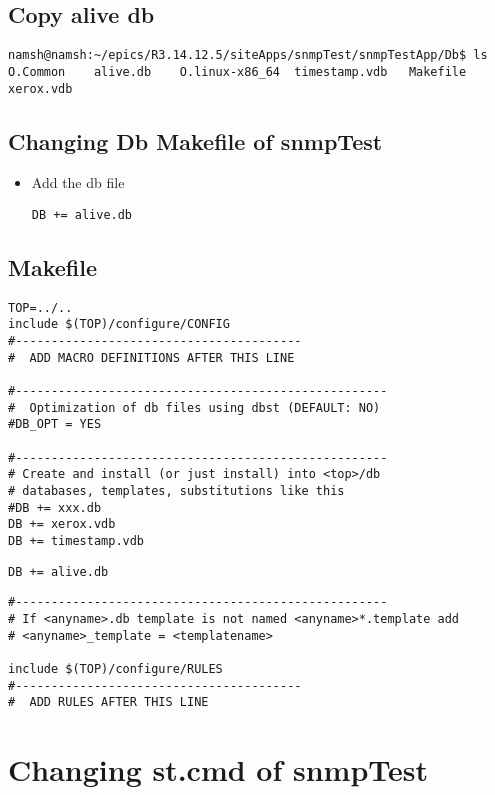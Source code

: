 \documentclass[11pt
  , a4paper
  , article
  , oneside
]{memoir}
\begin{document}
\subsection{Copy alive db}
\begin{lstlisting}[style=termstyle]
namsh@namsh:~/epics/R3.14.12.5/siteApps/snmpTest/snmpTestApp/Db$ ls
O.Common	alive.db	O.linux-x86_64	timestamp.vdb	Makefile	xerox.vdb
\end{lstlisting}
\subsection{Changing Db Makefile of snmpTest}
\begin{itemize}
\item Add the db file
\begin{lstlisting}[style=termstyle]
DB += alive.db
\end{lstlisting}
\end{itemize}
\subsection{Makefile}
\begin{lstlisting}[style=termstyle]
TOP=../..
include $(TOP)/configure/CONFIG
#----------------------------------------
#  ADD MACRO DEFINITIONS AFTER THIS LINE

#----------------------------------------------------
#  Optimization of db files using dbst (DEFAULT: NO)
#DB_OPT = YES

#----------------------------------------------------
# Create and install (or just install) into <top>/db
# databases, templates, substitutions like this
#DB += xxx.db
DB += xerox.vdb
DB += timestamp.vdb
\end{lstlisting}
\begin{lstlisting}[style=termstyle]
DB += alive.db
\end{lstlisting}
\begin{lstlisting}[style=termstyle]
#----------------------------------------------------
# If <anyname>.db template is not named <anyname>*.template add
# <anyname>_template = <templatename>

include $(TOP)/configure/RULES
#----------------------------------------
#  ADD RULES AFTER THIS LINE
\end{lstlisting}

\section{Changing st.cmd of snmpTest}
\end{document}
